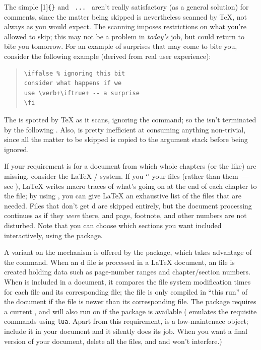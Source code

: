 The simple [1]\texttt{\{\}} 
and \texttt{ ... } aren't really satisfactory (as
a general solution) for comments, since the matter being skipped is
nevertheless scanned by \TeX{}, not always as you would expect.  The
scanning imposes restrictions on what you're allowed to skip; this may
not be a problem in \emph{today's} job, but could return to bite you
tomorrow.  For an example of surprises that may come to bite you,
consider the following example (derived from real user experience):
\begin{quote}
\begin{verbatim}
\iffalse % ignoring this bit
consider what happens if we
use \verb+\iftrue+ -- a surprise
\fi
\end{verbatim}
\end{quote}
The  is spotted by \TeX{} as it scans, ignoring the
 command; so the  isn't terminated by the
following .  Also,  is pretty inefficient at
consuming anything non-trivial, since all the matter to be skipped is
copied to the argument stack before being ignored.

If your requirement is for a document from which whole chapters (or
the like) are missing, consider the \LaTeX{}
/ system.  If you `' your
files (rather than  them~--- see %
),
\LaTeX{} writes macro traces of what's going on at the end of each
chapter to the  file; by using , you can give
\LaTeX{} an exhaustive list of the files that are needed.  Files that
don't get d are skipped entirely, but the document
processing continues as if they \emph{were} there, and page, footnote,
and other numbers are not disturbed.  Note that you can choose which
sections you want included interactively, using the
 package.

A variant on the  mechanism is offered by the
 package, which takes advantage of the \pdftex{}
 command.  When an d file is
processed in a \LaTeX{} document, an  file is created
holding data such as page-number ranges and chapter/section numbers.
When  is included in a document, it compares the
file system modification times for each file and its corresponding
 file; the file is only compiled in ``this run'' of the
document if the file is newer than its corresponding 
file.  The package requires a current \pdftex{}, and will also run on
\LuaTeX{} if the  package is available
( emulates the requisite \pdftex{} commands using
\texttt{lua}.  Apart from this requirement,  is
a low-maintenace object; include it in your document and it silently
does its job.  When you want a final version of your document, delete
all the  files, and and  won't
interfere.)

